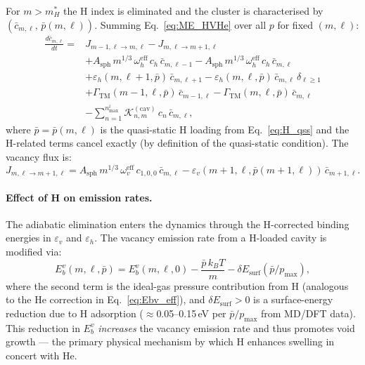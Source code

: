 For $m > m_H^*$ the H index is eliminated and the cluster is
characterised by $(\bar{c}_{m,\ell},\,\bar{p}(m,\ell))$.  Summing
Eq.~\eqref{eq:ME_HVHe} over all $p$ for fixed $(m,\ell)$:
\begin{equation}\label{eq:ME_cbar_ml}
\begin{split}
\frac{d\bar{c}_{m,\ell}}{dt}
= {} &
    J_{m-1,\ell \to m,\ell} - J_{m,\ell \to m+1,\ell}
  \\
  &+ A_{\mathrm{sph}}\,m^{1/3}\,\omega_h^{\mathrm{eff}}\,c_h\,
     \bar{c}_{m,\ell-1}
   - A_{\mathrm{sph}}\,m^{1/3}\,\omega_h^{\mathrm{eff}}\,c_h\,
     \bar{c}_{m,\ell}
  \\
  &+ \varepsilon_h(m,\ell{+}1,\bar{p})\,\bar{c}_{m,\ell+1}
   - \varepsilon_h(m,\ell,\bar{p})\,\bar{c}_{m,\ell}\,\delta_{\ell\geq 1}
  \\
  &+ \Gamma_{\mathrm{TM}}(m{-}1,\ell,\bar{p})\,\bar{c}_{m-1,\ell}
   - \Gamma_{\mathrm{TM}}(m,\ell,\bar{p})\,\bar{c}_{m,\ell}
  \\
  &- \sum_{n=1}^{n_{\max}^i}
     \mathcal{K}_{n,m}^{(\mathrm{cav})}\,c_n\,\bar{c}_{m,\ell},
\end{split}
\end{equation}
where $\bar{p} = \bar{p}(m,\ell)$ is the quasi-static H loading from
Eq.~\eqref{eq:H_qss} and the H-related terms cancel exactly (by
definition of the quasi-static condition).  The vacancy flux is:
\begin{equation}\label{eq:Jvml}
    J_{m,\ell \to m+1,\ell}
    = A_{\mathrm{sph}}\,m^{1/3}\,\omega_v^{\mathrm{eff}}\,
      c_{1,0,0}\,\bar{c}_{m,\ell}
    - \varepsilon_v(m{+}1,\ell,\bar{p}(m{+}1,\ell))\,
      \bar{c}_{m+1,\ell}.
\end{equation}

\paragraph{Effect of H on emission rates.}
The adiabatic elimination enters the dynamics through the H-corrected
binding energies in $\varepsilon_v$ and $\varepsilon_h$.  The vacancy
emission rate from a H-loaded cavity is modified via:
\begin{equation}\label{eq:Ebv_H}
    E_b^v(m,\ell,\bar{p})
    = E_b^v(m,\ell,0)
    - \frac{\bar{p}\,k_BT}{m}
    - \delta E_{\mathrm{surf}}(\bar{p}/p_{\max}),
\end{equation}
where the second term is the ideal-gas pressure contribution from H
(analogous to the He correction in Eq.~\ref{eq:Ebv_eff}), and
$\delta E_{\mathrm{surf}} > 0$ is a surface-energy reduction due to H
adsorption ($\approx$0.05--0.15\,eV per $\bar{p}/p_{\max}$ from
MD/DFT data).  This reduction in $E_b^v$ \emph{increases} the vacancy
emission rate and thus promotes void growth --- the primary physical
mechanism by which H enhances swelling in concert with He.

